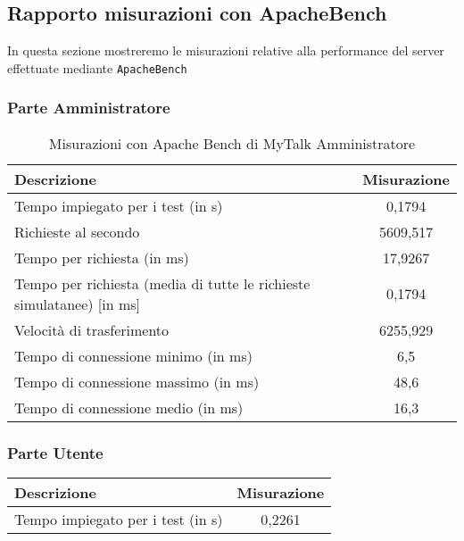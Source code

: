 {{	\newpage
	\subsection{Rapporto misurazioni con ApacheBench}{
In questa sezione mostreremo le misurazioni relative alla performance del server effettuate mediante \texttt{ApacheBench}
\subsubsection{Parte Amministratore}
	\begin{table}[h!]
\scriptsize
		\begin{center}
					\begin{tabular}{l c}				
					\toprule
					Descrizione & Misurazione\\ 
					\midrule
					Tempo impiegato per i test (in s) & 0,1794\\
					
					Richieste al secondo & 5609,517\\
					
					Tempo per richiesta (in ms) & 17,9267\\
					
					Tempo per richiesta (media di tutte le richieste simulatanee) [in ms] & 0,1794\\
					
					Velocità di trasferimento & 6255,929\\
					
					Tempo di connessione minimo (in ms) & 6,5\\
					
					Tempo di connessione massimo (in ms) & 48,6\\
					
					Tempo di connessione medio (in ms) & 16,3\\

					\bottomrule
					\end{tabular}
			
		\end{center}	
		\caption{Misurazioni con Apache Bench di MyTalk Amministratore} 
	\end{table}
	
\subsubsection{Parte Utente}
	\begin{table}[h!]
\scriptsize
		\begin{center}
					\begin{tabular}{l c}				
					\toprule
					Descrizione & Misurazione\\ 
					\midrule
					Tempo impiegato per i test (in s) & 0,2261\\
					

\end{tabular}
\end{center}
\end{table}}}}
